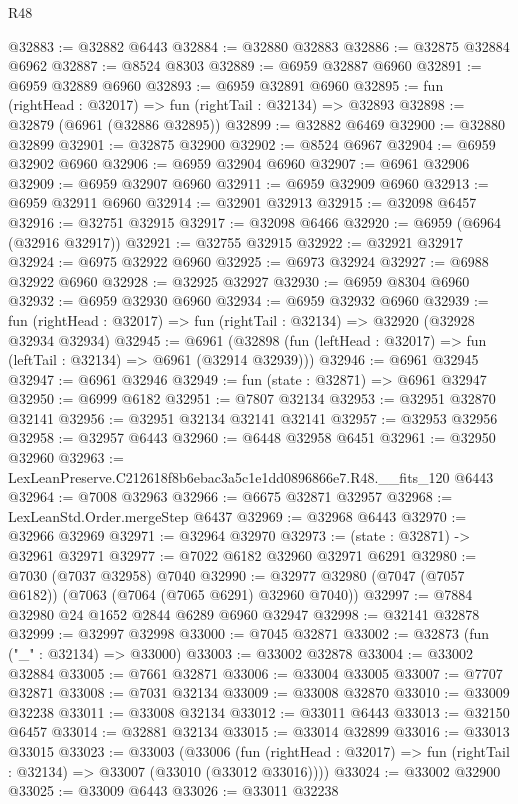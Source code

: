 \begin{lexlean}{R48}
\begin{coremodule}
@32883 := @32882 @6443
@32884 := @32880 @32883
@32886 := @32875 @32884 @6962
@32887 := @8524 @8303
@32889 := @6959 @32887 @6960
@32891 := @6959 @32889 @6960
@32893 := @6959 @32891 @6960
@32895 := fun (rightHead : @32017) => fun (rightTail : @32134) => @32893
@32898 := @32879 (@6961 (@32886 @32895))
@32899 := @32882 @6469
@32900 := @32880 @32899
@32901 := @32875 @32900
@32902 := @8524 @6967
@32904 := @6959 @32902 @6960
@32906 := @6959 @32904 @6960
@32907 := @6961 @32906
@32909 := @6959 @32907 @6960
@32911 := @6959 @32909 @6960
@32913 := @6959 @32911 @6960
@32914 := @32901 @32913
@32915 := @32098 @6457
@32916 := @32751 @32915
@32917 := @32098 @6466
@32920 := @6959 (@6964 (@32916 @32917))
@32921 := @32755 @32915
@32922 := @32921 @32917
@32924 := @6975 @32922 @6960
@32925 := @6973 @32924
@32927 := @6988 @32922 @6960
@32928 := @32925 @32927
@32930 := @6959 @8304 @6960
@32932 := @6959 @32930 @6960
@32934 := @6959 @32932 @6960
@32939 := fun (rightHead : @32017) => fun (rightTail : @32134) => @32920 (@32928 @32934 @32934)
@32945 := @6961
    (@32898 (fun (leftHead : @32017) => fun (leftTail : @32134) => @6961 (@32914 @32939)))
@32946 := @6961 @32945
@32947 := @6961 @32946
@32949 := fun (state : @32871) => @6961 @32947
@32950 := @6999 @6182
@32951 := @7807 @32134
@32953 := @32951 @32870 @32141
@32956 := @32951 @32134 @32141 @32141
@32957 := @32953 @32956
@32958 := @32957 @6443
@32960 := @6448 @32958 @6451
@32961 := @32950 @32960
@32963 := LexLeanPreserve.C212618f8b6ebac3a5c1e1dd0896866e7.R48.__fits_120 @6443
@32964 := @7008 @32963
@32966 := @6675 @32871 @32957
@32968 := LexLeanStd.Order.mergeStep @6437
@32969 := @32968 @6443
@32970 := @32966 @32969
@32971 := @32964 @32970
@32973 := (state : @32871) -> @32961 @32971
@32977 := @7022 @6182 @32960 @32971 @6291
@32980 := @7030 (@7037 @32958) @7040
@32990 := @32977 @32980 (@7047 (@7057 @6182)) (@7063 (@7064 (@7065 @6291) @32960 @7040))
@32997 := @7884 @32980 @24 @1652 @2844 @6289 @6960 @32947
@32998 := @32141 @32878
@32999 := @32997 @32998
@33000 := @7045 @32871
@33002 := @32873 (fun ("_" : @32134) => @33000)
@33003 := @33002 @32878
@33004 := @33002 @32884
@33005 := @7661 @32871
@33006 := @33004 @33005
@33007 := @7707 @32871
@33008 := @7031 @32134
@33009 := @33008 @32870
@33010 := @33009 @32238
@33011 := @33008 @32134
@33012 := @33011 @6443
@33013 := @32150 @6457
@33014 := @32881 @32134
@33015 := @33014 @32899
@33016 := @33013 @33015
@33023 := @33003
    (@33006
      (fun (rightHead : @32017) => fun (rightTail : @32134) => @33007 (@33010 (@33012 @33016))))
@33024 := @33002 @32900
@33025 := @33009 @6443
@33026 := @33011 @32238

\end{coremodule}
\end{lexlean}

